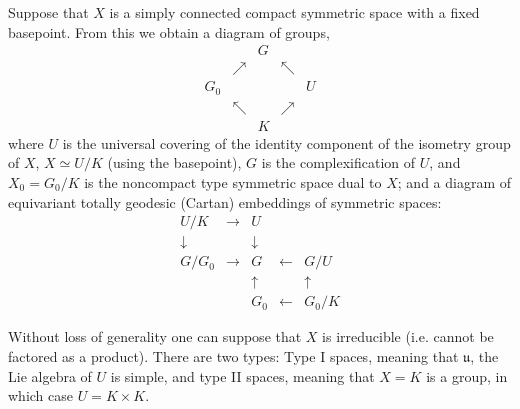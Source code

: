 \documentclass{amsart}
\theoremstyle{conjecture}
\theoremstyle{definition}
\theoremstyle{question}
\theoremstyle{questions}
\theoremstyle{remark}
\theoremstyle{remarks}
\theoremstyle{example}
\numberwithin{equation}{section}
\begin{document}
Suppose that $X$ is a simply connected compact symmetric space
with a fixed basepoint.  From this we obtain a diagram of groups,
\begin{equation}\label{diagram_of_groups}
\begin{matrix}& & G & &\\
 & \nearrow& & \nwarrow &\\
 G_0  & & & & U  \\
 & \nwarrow& & \nearrow &\\
& & K  && \end{matrix}
\end{equation}
where $U$ is the universal covering of the identity component of
the isometry group of $X$, $X\simeq U/K$ (using the basepoint), $G$ is the
complexification of $U$, and $X_0=G_0/K$ is the noncompact type
symmetric space dual to $X$; and a diagram of equivariant totally
geodesic (Cartan) embeddings of symmetric spaces:
\begin{equation}\label{CartanEmbeddings}
\begin{matrix}
U/K & \rightarrow & U & &  \\
\downarrow & & \downarrow & &\\
G/G_0 & \rightarrow & G & \leftarrow &G/U  \\
 & &\uparrow & & \uparrow\\
& & G_0 &\leftarrow & G_0/K  \end{matrix}
\end{equation}

Without loss of generality one can suppose that $X$ is irreducible (i.e. cannot be factored as a product). 
There are two types: Type I spaces, meaning that $\mathfrak u$, the Lie algebra of $U$ is simple,
and type II spaces, meaning that $X=K$ is a group, in which case $U=K\times K$.
 
\end{document}
